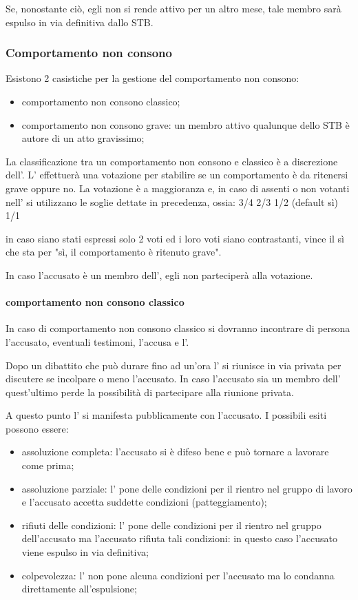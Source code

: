 \documentclass[pdf]{article}
\theoremstyle{definition}
\begin{document}
Se, nonostante ciò, egli non si rende attivo per un altro mese, tale membro sarà espulso in via definitiva dallo STB.

\subsubsection{Comportamento non consono}


Esistono 2 casistiche per la gestione del comportamento non consono:

\begin{itemize}
	\item comportamento non consono classico;
	\item comportamento non consono grave: un membro attivo qualunque dello STB è autore di un atto gravissimo;
\end{itemize}

La classificazione tra un comportamento non consono e classico è a discrezione dell'\EC{}. L'\EC{} effettuerà una votazione per stabilire se un comportamento è da ritenersi grave oppure no. La votazione è a maggioranza e, in caso di assenti o non votanti nell'\EC{} si utilizzano le soglie dettate in precedenza, ossia:
3/4
2/3
1/2 (default sì)
1/1

in caso siano stati espressi solo 2 voti ed i loro voti siano contrastanti, vince il sì che sta per "sì, il comportamento è ritenuto grave".

In caso l'accusato è un membro dell'\EC{}, egli non parteciperà alla votazione.

\paragraph{comportamento non consono classico}

In caso di comportamento non consono classico si dovranno incontrare di persona l'accusato, eventuali testimoni, l'accusa e l'\EC{}.

Dopo un dibattito che può durare fino ad un'ora l'\EC{} si riunisce in via privata per discutere se incolpare o meno l'accusato. In caso l'accusato sia un membro dell'\EC{} quest'ultimo perde la possibilità di partecipare alla riunione privata.

A questo punto l'\EC{} si manifesta pubblicamente con l'accusato.
I possibili esiti possono essere:
\begin{itemize}
	\item assoluzione completa: l'accusato si è difeso bene e può tornare a lavorare come prima;
	\item assoluzione parziale: l'\EC{} pone delle condizioni per il rientro nel gruppo di lavoro e l'accusato accetta suddette condizioni (patteggiamento);
	\item rifiuti delle condizioni: l'\EC{} pone delle condizioni per il rientro nel gruppo dell'accusato ma l'accusato rifiuta tali condizioni: in questo caso l'accusato viene espulso in via definitiva;
	\item colpevolezza: l'\EC{} non pone alcuna condizioni per l'accusato ma lo condanna direttamente all'espulsione;
\end{itemize}
\end{document}
